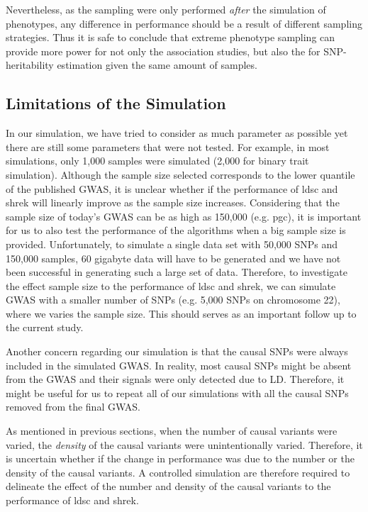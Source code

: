 \documentclass[12pt]{scrbook}
\begin{document}
Nevertheless, as the sampling were only performed \emph{after} the simulation of phenotypes, any difference in performance should be a result of different sampling strategies. 
Thus it is safe to conclude that extreme phenotype sampling can provide more power for not only the association studies, but also the for \gls{SNP}-heritability estimation given the same amount of samples.

\subsection{Limitations of the Simulation}
In our simulation, we have tried to consider as much parameter as possible yet there are still some parameters that were not tested.
For example, in most simulations, only 1,000 samples were simulated (2,000 for binary trait simulation).
Although the sample size selected corresponds to the lower quantile of the published \gls{GWAS}, it is unclear whether if the performance of \gls{ldsc} and \gls{shrek} will linearly improve as the sample size increases.
Considering that the sample size of today's \gls{GWAS} can be as high as 150,000 (e.g. \gls{pgc}), it is important for us to also test the performance of the algorithms when a big sample size is provided. 
Unfortunately, to simulate a single data set with 50,000 \glspl{SNP} and 150,000 samples, 60 gigabyte data will have to be generated and we have not been successful in generating such a large set of data. 
Therefore, to investigate the effect sample size to the performance of \gls{ldsc} and \gls{shrek}, we can simulate \gls{GWAS} with a smaller number of \glspl{SNP} (e.g. 5,000 \glspl{SNP} on chromosome 22), where we varies the sample size. 
This should serves as an important follow up to the current study.

Another concern regarding our simulation is that the causal \glspl{SNP} were always included in the simulated \gls{GWAS}.
In reality, most causal \glspl{SNP} might be absent from the \gls{GWAS} and their signals were only detected due to \gls{LD}.
Therefore, it might be useful for us to repeat all of our simulations with all the causal \glspl{SNP} removed from the final \gls{GWAS}.

As mentioned in previous sections, when the number of causal variants were varied, the \emph{density} of the causal variants were unintentionally varied. 
Therefore, it is uncertain whether if the change in performance was due to the number or the density of the causal variants. 
A controlled simulation are therefore required to delineate the effect of the number and density of the causal variants to the performance of \gls{ldsc} and \gls{shrek}.
\end{document}

